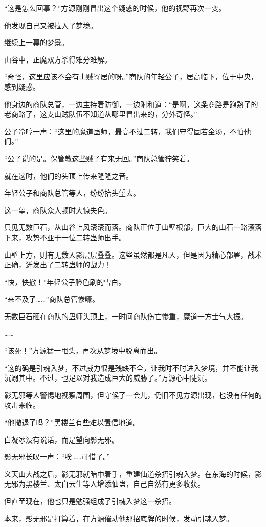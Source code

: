 \begin{this_body}
“这是怎么回事？”方源刚刚冒出这个疑惑的时候，他的视野再次一变。

他发现自己又被拉入了梦境。

继续上一幕的梦景。

山谷中，正魔双方杀得难分难解。

“奇怪，这里应该不会有山贼寄居的呀。”商队的年轻公子，居高临下，位于中央，感到疑惑。

他身边的商队总管，一边主持着防御，一边附和道：“是啊，这条商路是跑熟了的老商路了，这支山贼队伍不知道从哪里冒出来的，分外奇怪。”

公子冷哼一声：“这里的魔道蛊师，最高不过二转，我们守得固若金汤，不怕他们。”

“公子说的是。保管教这些贼子有来无回。”商队总管狞笑着。

就在这时，他们的头顶上传来隆隆之音。

年轻公子和商队总管等人，纷纷抬头望去。

这一望，商队众人顿时大惊失色。

只见无数巨石，从山谷上风滚滚而落。商队正位于山壁根部，巨大的山石一路滚落下来，攻势不亚于一位二转蛊师出手。

山壁上方，则有无数人影层层叠叠。这些虽然都是凡人，但是因为精心部署，战术正确，迸发出了二转蛊师的战力！

“快，快撤！”年轻公子脸色刷的雪白。

“来不及了……”商队总管惨嚎。

无数巨石砸在商队的蛊师头顶上，一时间商队伤亡惨重，魔道一方士气大振。

……

“该死！”方源猛一甩头，再次从梦境中脱离而出。

“这的确是引魂入梦，不过威力很是残缺不全，让我时不时进入梦境，并不能让我沉溺其中。不过，也足以对我造成巨大的威胁了。”方源心中陡沉。

影无邪等人警惕地视察周围，但守候了一会儿，仍旧不见方源出现，也没有任何的攻击来临。

“他撤退了吗？”黑楼兰有些难以置信地道。

白凝冰没有说话，而是望向影无邪。

影无邪长叹一声：“唉……可惜了。”

义天山大战之后，影无邪就暗中着手，重建仙道杀招引魂入梦。在东海的时候，影无邪为黑楼兰、太白云生等人增添仙蛊，自己自然有更多收获。

但直至现在，他也只是勉强组成了引魂入梦这一杀招。

本来，影无邪是打算着，在方源催动他那招底牌的时候，发动引魂入梦。


\end{this_body}
